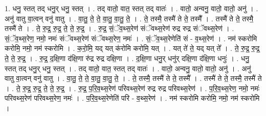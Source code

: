 \documentclass[17pt]{extarticle}
\begin{document}
1. धनु॒ स्तत् तद् धनु॒र् धनु॒ स्तत् । . तद् वातो॒ वात॒ स्तत् तद् वातः॑ । . वातो॒ अन्वनु॒ वातो॒ वातो॒ अनु॑ । . अनु॑ वातु वा॒त्वन् वनु॑ वातु । . वा॒तु॒ ते॒ ते॒ वा॒तु॒ वा॒तु॒ ते॒ । . ते॒ तस्मै॒ तस्मै॑ ते ते॒ तस्मै᳚ । . तस्मै॑ ते ते॒ तस्मै॒ तस्मै॑ ते । . ते॒ रु॒द्र॒ रु॒द्र॒ ते॒ ते॒ रु॒द्र॒ । . रु॒द्र॒ सं॒ॅव॒थ्स॒रेण॑ संॅवथ्स॒रेण॑ रुद्र रुद्र संॅवथ्स॒रेण॑ । . सं॒ॅव॒थ्स॒रेण॒ नमो॒ नमः॑ संॅवथ्स॒रेण॑ संॅवथ्स॒रेण॒ नमः॑ । . सं॒ॅव॒थ्स॒रेणेति॑ सं - व॒थ्स॒रेण॑ । . नम॑ स्करोमि करोमि॒ नमो॒ नम॑ स्करोमि । . क॒रो॒मि॒ यद् यत् क॑रोमि करोमि॒ यत् । . यत् ते॑ ते॒ यद् यत् ते᳚ । . ते॒ रु॒द्र॒ रु॒द्र॒ ते॒ ते॒ रु॒द्र॒ । . रु॒द्र॒ द॒क्षि॒णा द॑क्षि॒णा रु॑द्र रुद्र दक्षि॒णा । . द॒क्षि॒णा धनु॒र् धनु॑र् दक्षि॒णा द॑क्षि॒णा धनुः॑ । . धनु॒ स्तत् तद् धनु॒र् धनु॒ स्तत् । . तद् वातो॒ वात॒ स्तत् तद् वातः॑ । . वातो॒ अन्वनु॒ वातो॒ वातो॒ अनु॑ । . अनु॑ वातु वा॒त्वन् वनु॑ वातु । . वा॒तु॒ ते॒ ते॒ वा॒तु॒ वा॒तु॒ ते॒ । . ते॒ तस्मै॒ तस्मै॑ ते ते॒ तस्मै᳚ । . तस्मै॑ ते ते॒ तस्मै॒ तस्मै॑ ते । . ते॒ रु॒द्र॒ रु॒द्र॒ ते॒ ते॒ रु॒द्र॒ । . रु॒द्र॒ प॒रि॒व॒थ्स॒रेण॑ परिवथ्स॒रेण॑ रुद्र रुद्र परिवथ्स॒रेण॑ । . प॒रि॒व॒थ्स॒रेण॒ नमो॒ नमः॑ परिवथ्स॒रेण॑ परिवथ्स॒रेण॒ नमः॑ । . प॒रि॒व॒थ्स॒रेणेति॑ परि - व॒थ्स॒रेण॑ । . नम॑ स्करोमि करोमि॒ नमो॒ नम॑ स्करोमि । \newline
\end{document}
